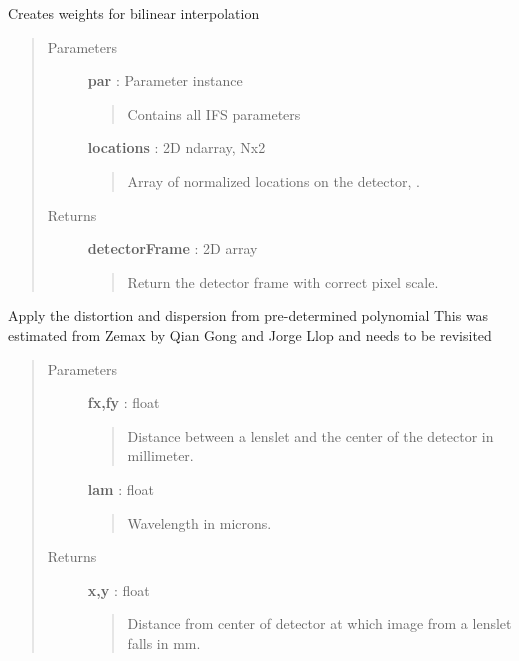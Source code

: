\documentclass[letterpaper,10pt,english]{sphinxmanual}
\begin{document}
\begin{fulllineitems}
\label{tools:tools.spectrograph.createAllWeightsArray}
Creates weights for bilinear interpolation
\begin{quote}\begin{description}
\item[{Parameters}] \leavevmode
\textbf{par} :   Parameter instance
\begin{quote}

Contains all IFS parameters
\end{quote}

\textbf{locations} : 2D ndarray, Nx2
\begin{quote}

Array of normalized locations on the detector, .
\end{quote}

\item[{Returns}] \leavevmode
\textbf{detectorFrame} : 2D array
\begin{quote}

Return the detector frame with correct pixel scale.
\end{quote}

\end{description}\end{quote}

\end{fulllineitems}


\begin{fulllineitems}
\label{tools:tools.spectrograph.distort}
Apply the distortion and dispersion from pre-determined polynomial
This was estimated from Zemax by Qian Gong and Jorge Llop and needs to be revisited
\begin{quote}\begin{description}
\item[{Parameters}] \leavevmode
\textbf{fx,fy} :   float
\begin{quote}

Distance between a lenslet and the center of the detector in millimeter.
\end{quote}

\textbf{lam} : float
\begin{quote}

Wavelength in microns.
\end{quote}

\item[{Returns}] \leavevmode
\textbf{x,y} : float
\begin{quote}

Distance from center of detector at which image from a lenslet falls in mm.
\end{quote}

\end{description}\end{quote}

\end{fulllineitems}
\end{document}
